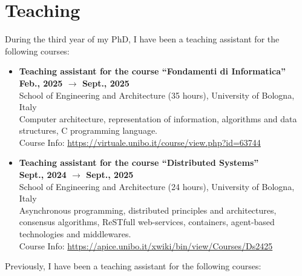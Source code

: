 \documentclass[11pt]{article}
\begin{document}
\section{Teaching}\label{sec:teaching}
%
During the third year of my PhD, I have been a teaching assistant for the following courses:
%
\begin{itemize}
	\item \textbf{Teaching assistant for the course ``Fondamenti di Informatica'' }
	\\\hfill \textbf{Feb., 2025 $\rightarrow$ Sept., 2025}
	\\School of Engineering and Architecture (35 hours), University of Bologna, Italy
	\\Computer architecture, representation of information, algorithms and data structures, C programming language.
	\\Course Info: \url{https://virtuale.unibo.it/course/view.php?id=63744}
	\item \textbf{Teaching assistant for the course ``Distributed Systems'' }
	\\\hfill \textbf{Sept., 2024 $\rightarrow$ Sept., 2025}
	\\School of Engineering and Architecture (24 hours), University of Bologna, Italy
	\\Asynchronous programming, distributed principles and architectures, consensus algorithms, ReSTfull web-services, containers, agent-based technologies and middlewares.
	\\Course Info: \url{https://apice.unibo.it/xwiki/bin/view/Courses/Ds2425}

\end{itemize}
%
Previously, I have been a teaching assistant for the following courses:
%
\end{document}
